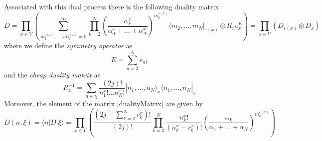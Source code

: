 \documentclass[11pt]{article}
\numberwithin{equation}{section}
\begin{document}
Associated with this dual process there is the following duality matrix 
\begin{equation}\label{dualityMatrix}
	D=\prod_{x\in V}\left(\sum_{m_{2}^{\varepsilon(x)},\ldots,m_{N}^{\varepsilon(x)}=0}^{\infty}\prod_{k=2}^{N}\left(\frac{\alpha_{k}^{x}}{\alpha_{0}^{x}+\ldots+\alpha_{N}^{x}}\right)^{m_{k}^{\varepsilon(x)}}\langle m_{2},\ldots,m_{N}|_{\varepsilon(x)}\otimes R_{x}e^{E}_{x} \right)
	=\prod_{x\in V}\left(D_{\varepsilon(x)}\otimes D_{x}\right)
\end{equation}
where we define the \textit{symmetry operator} as
\begin{equation}\label{e_def}
	E=\sum_{a=2}^{N}e_{a1}
\end{equation}
and the \textit{cheap duality matrix} as 
\begin{equation}
	R^{-1}_{x}=\sum_{n\in \chi}\frac{(2j)!}{n_{1}^{x}!\ldots n_{N}^{x}!}|n_{1},\ldots,n_{N}\rangle_{x}\langle n_{1},\ldots,n_{N}|_{x}%
\end{equation}
Moreover, the element of the matrix \eqref{dualityMatrix} are given by
\begin{equation}\label{dualityElements}
	D(n,\xi)=\langle n|D|\xi\rangle=\prod_{x\in V}\left(\frac{(2j-\sum_{k=2}^{N}r_{k}^{x})!}{(2j)!}\prod_{k=2}^{N}\frac{n_{k}^{x}!}{(n_{k}^{x}-r_{k}^{x})!}\left(\frac{\alpha_{k}}{\alpha_{1}+\ldots+\alpha_{N}}\right)^{m_{k}^{\varepsilon(x)}}\right)
\end{equation}
\end{document}
